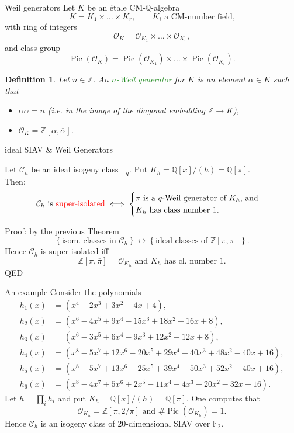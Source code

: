 \documentclass[usenames,dvipsnames,handout]{beamer}
\def\Q{\mathbb{Q}}
\def\Z{\mathbb{Z}}
\def\F{\mathbb{F}}
\DeclareMathOperator{\Pic}{Pic}
\newcommand{\cC}{{\mathcal C}}
\newcommand{\cO}{{\mathcal O}}
\newcommand{\set}[1]{\left\lbrace#1\right\rbrace }
\newcommand{\red}[1]{\textcolor{red}{#1}}
\newcommand{\green}[1]{\textcolor{ForestGreen}{#1}}
\newtheorem{df}{Definition}[section]
\begin{document}
\begin{frame}{ Weil generators }
    Let $K$ be an \'etale CM-$\Q$-algebra
    \[ K = K_1 \times \ldots \times K_r,\qquad K_i\text{ a CM-number field,} \]
    \pause with ring of integers
    \[ \cO_K=\cO_{K_1}\times \ldots \times \cO_{K_r},\]
    \pause and class group
    \[ \Pic(\cO_K)=\Pic(\cO_{K_1})\times \ldots \times \Pic(\cO_{K_r}).\]
    \pause
    \begin{df}
        Let $n\in\Z$. An \green{$n$-Weil generator} for $K$ is an element $\alpha\in K$ such that
        \begin{itemize}
         \pause \item $\alpha \overline\alpha = n $ (i.e. in the image of the diagonal embedding $\Z\to K$),
         \pause \item $\cO_K=\Z[\alpha,\overline\alpha]$.
        \end{itemize}
    \end{df}
\end{frame}

\begin{frame}{ ideal SIAV \& Weil Generators }
    \begin{theorem}
	    Let $\cC_{h}$ be an ideal isogeny class $\F_q$.
	    Put $K_h=\Q[x]/(h)=\Q[\pi]$.\\
	    \pause Then:
	    \[ 
	        \text{$\cC_h$ is \red{super-isolated}} \iff 
		    \begin{cases}
		     \text{$\pi$ is a $q$-Weil generator of $K_h$, and}\\
		     \text{$K_h$ has class number $1$.}
		    \end{cases}
		\]
    \end{theorem}
    \pause Proof: by the previous Theorem 
    \[ \set{\text{isom.~classes in $\cC_{h}$}}
       \longleftrightarrow
       \set{\text{ideal classes of $\Z[\pi,\overline{\pi}]$}}.\]
    \pause Hence $\cC_h$ is super-isolated iff
    \[ \Z[\pi,\overline{\pi}]=\cO_{K_h} \text{ and } K_h \text{ has cl.~number }1.\]
    QED
\end{frame}

\begin{frame}{ An example }
    Consider the polynomials
    \begin{align*}
	    h_1(x) &= (x^4 - 2x^3 + 3x^2 - 4x + 4), \\
	    h_2(x) &= (x^6 - 4x^5 + 9x^4 - 15x^3 + 18x^2 - 16x + 8), \\
	    h_3(x) &= (x^6 - 3x^5 + 6x^4 - 9x^3 + 12x^2 - 12x + 8), \\
	    h_4(x) &= (x^8 - 5x^7 + 12x^6 - 20x^5 + 29x^4 - 40x^3 + 48x^2 - 40x + 16), \\
	    h_5(x) &= (x^8 - 5x^7 + 13x^6 - 25x^5 + 39x^4 - 50x^3 + 52x^2 - 40x + 16), \\
	    h_6(x) &= (x^8 - 4x^7 + 5x^6 + 2x^5 - 11x^4 + 4x^3 + 20x^2 - 32x + 16).
    \end{align*}
    Let $h=\prod_i h_i$ and put $K_h=\Q[x]/(h)=\Q[\pi]$.
    \pause One computes that
    \[ \cO_{K_h}=\Z[\pi,2/\pi] \text{ and } \#\Pic(\cO_{K_h})=1. \]
    Hence $\cC_h$ is an isogeny class of $20$-dimensional SIAV over $\F_2$.
\end{frame}
\end{document}
